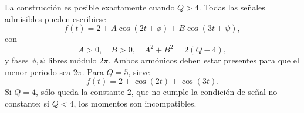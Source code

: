 La construcción es posible exactamente cuando \(Q>4\). Todas las señales admisibles pueden escribirse
\[
f(t)=2+A\cos(2t+\phi)+B\cos(3t+\psi),
\]
con
\[
A>0,\quad B>0,\quad A^2+B^2=2(Q-4),
\]
y fases \(\phi,\psi\) libres módulo \(2\pi\). Ambos armónicos deben estar presentes para que el menor periodo sea \(2\pi\). Para \(Q=5\), sirve
\[
f(t)=2+\cos(2t)+\cos(3t).
\]
Si \(Q=4\), sólo queda la constante \(2\), que no cumple la condición de señal no constante; si \(Q<4\), los momentos son incompatibles.
